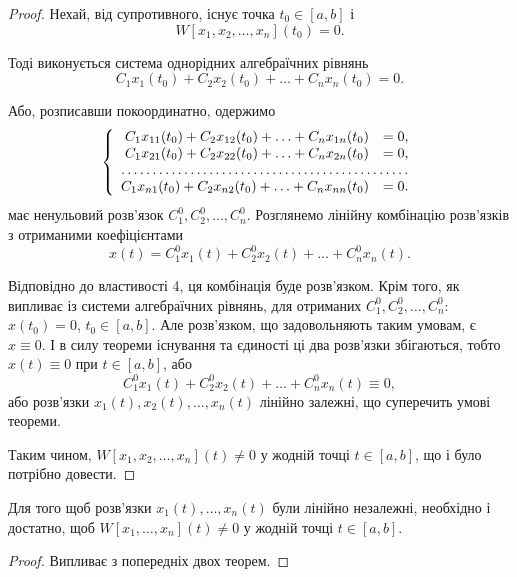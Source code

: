\begin{proof}
	Нехай, від супротивного, існує точка $t_0 \in [a, b]$ і \[W[x_1, x_2, \ldots, x_n](t_0) = 0.\]

	Тоді виконується система однорідних алгебраїчних рівнянь \[C_1 x_1(t_0) + C_2 x_2(t_0) + \ldots + C_n x_n(t_0) = 0. \]

	Або, розписавши покоординатно, одержимо
	\begin{equation*}
		\left\{
			\begin{array}{rl}
				C_1 x_{11}(t_0) + C_2 x_{12}(t_0) + \ldots + C_n x_{1n}(t_0) &= 0, \\
				C_1 x_{21}(t_0) + C_2 x_{22}(t_0) + \ldots + C_n x_{2n}(t_0) &= 0, \\
				\hdotsfor{2} \\
				C_1 x_{n1}(t_0) + C_2 x_{n2}(t_0) + \ldots + C_n x_{nn}(t_0) &= 0.
			\end{array}
		\right.
	\end{equation*}
 	має ненульовий розв'язок $C_1^0, C_2^0, \ldots, C_n^0$. Розглянемо лінійну комбінацію розв'язків з отриманими коефіцієнтами
 	\begin{equation*}
 		x(t) = C_1^0 x_1(t) + C_2^0 x_2(t) + \ldots + C_n^0 x_n(t).
 	\end{equation*}

	Відповідно до властивості 4, ця комбінація буде розв'язком. Крім того, як випливає із системи алгебраїчних рівнянь, для отриманих $C_1^0, C_2^0, \ldots, C_n^0$: $x(t_0) = 0$, $t_0 \in [a, b]$. Але розв'язком, що задовольняють таким умовам, є $x \equiv 0$. І в силу теореми існування та єдиності ці два розв'язки збігаються, тобто $x(t) \equiv 0$ при $t \in [a, b]$, або 
 	\begin{equation*}
 		C_1^0 x_1(t) + C_2^0 x_2(t) + \ldots + C_n^0 x_n(t) \equiv 0,
 	\end{equation*}
	або розв'язки $x_1(t), x_2(t), \ldots, x_n(t)$ лінійно залежні, що суперечить умові теореми.  \parvskip

	Таким чином, $W[x_1, x_2, \ldots, x_n](t) \ne 0$ у жодній точці $t \in [a, b]$, що і було потрібно довести.
\end{proof}

\begin{theorem}
	Для того щоб розв'язки $x_1(t), \ldots, x_n(t)$ були лінійно незалежні, необхідно і достатно, щоб $W[x_1, \ldots, x_n](t) \ne 0$ у жодній точці $t \in [a, b]$.
\end{theorem}

\begin{proof}
	Випливає з попередніх двох теорем.
\end{proof}

